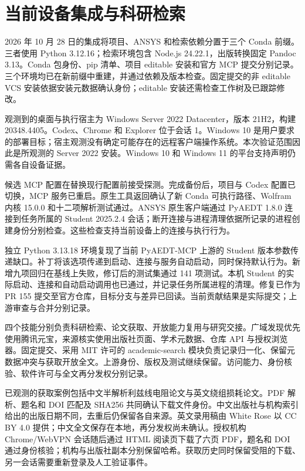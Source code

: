 \section{当前设备集成与科研检索}
\label{chapter:07}

\hypertarget{auto.07.conda}{}
2026 年 10 月 28 日的集成将项目、ANSYS 和检索依赖分置于三个 Conda 前缀。三者使用 Python 3.12.16；检索环境包含 Node.js 24.22.1，出版转换固定 Pandoc 3.13。Conda 包身份、pip 清单、项目 editable 安装和官方 MCP 提交分别记录。三个环境均已在新前缀中重建，并通过依赖及版本检查。固定提交的非 editable VCS 安装依据安装元数据确认身份；editable 安装还需检查工作树及已跟踪修改。

\hypertarget{auto.07.platform}{}
观测到的桌面与执行宿主为 Windows Server 2022 Datacenter，版本 21H2，构建 20348.4405。Codex、Chrome 和 Explorer 位于会话 1。Windows 10 是用户要求的部署目标；宿主观测没有确定可能存在的远程客户端操作系统。本次验证范围因此是所观测的 Server 2022 安装。Windows 10 和 Windows 11 的平台支持声明仍需各自设备证据。

\hypertarget{auto.07.switch}{}
候选 MCP 配置在替换现行配置前接受探测。完成备份后，项目与 Codex 配置已切换，MCP 服务已重启。原生工具返回确认了新 Conda 可执行路径、Wolfram 内核 15.0.0 和十二项解析测试通过。ANSYS 原生客户端通过 PyAEDT 1.8.0 连接到任务所属的 Student 2025.2.4 会话；断开连接与进程清理依据所记录的进程创建身份分别检查。这些检查支持当前设备上的连接与执行行为。

\hypertarget{auto.07.student}{}
独立 Python 3.13.18 环境复现了当前 PyAEDT-MCP 上游的 Student 版本参数传递缺口。补丁将该选项传递到启动、连接与服务自动启动，同时保持默认行为。新增九项回归在基线上失败，修订后的测试集通过 141 项测试。本机 Student 的实际启动、连接和自动启动调用也已通过，并记录任务所属进程的清理。修复已作为 PR 155 提交至官方仓库，目标分支与差异已回读。当前贡献结果是实际提交；上游审查与合并分别记录。\cite{PYAEDTMCP}

\hypertarget{auto.07.research}{}
四个技能分别负责科研检索、论文获取、开放能力复用与研究交接。广域发现优先使用腾讯元宝，来源核实使用出版社页面、学术元数据、仓库 API 与授权浏览器。固定提交、采用 MIT 许可的 academic-search 模块负责记录归一化、保留元数据冲突与获取开放全文。上游身份、版权及测试继续保留。访问能力、身份核验、软件许可与全文再分发权分别记录。\cite{ACADEMICSEARCH}

\hypertarget{auto.07.acquisition}{}
已观测的获取案例包括中文半解析利兹线电阻论文与英文绕组损耗论文。PDF 解析、题名和 DOI 匹配及 SHA256 共同确认下载文件身份。中文出版社与机构索引给出的出版日期不同，去重后仍保留各自来源。英文录用稿由 White Rose 以 CC BY 4.0 提供；中文全文保存在本地，再分发权尚未确认。授权机构 Chrome/WebVPN 会话随后通过 HTML 阅读页下载了六页 PDF，题名和 DOI 通过身份核验；机构与出版社副本分别保留哈希。获取历史同时保留受阻的下载、另一会话需要重新登录及人工验证事件。\cite{C01,ZHU2026}


